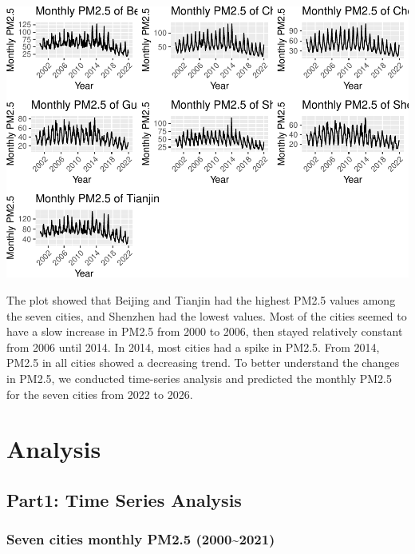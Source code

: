 \documentclass[
  12pt,
]{article}
\begin{document}
\includegraphics{LiFangRenZhang_ENV872_Project_files/figure-latex/TSA Visualization-1.pdf}

The plot showed that Beijing and Tianjin had the highest PM2.5 values
among the seven cities, and Shenzhen had the lowest values. Most of the
cities seemed to have a slow increase in PM2.5 from 2000 to 2006, then
stayed relatively constant from 2006 until 2014. In 2014, most cities
had a spike in PM2.5. From 2014, PM2.5 in all cities showed a decreasing
trend. To better understand the changes in PM2.5, we conducted
time-series analysis and predicted the monthly PM2.5 for the seven
cities from 2022 to 2026.

\newpage

\hypertarget{analysis}{%
\section{Analysis}\label{analysis}}

\hypertarget{part1-time-series-analysis}{%
\subsection{Part1: Time Series
Analysis}\label{part1-time-series-analysis}}

\hypertarget{seven-cities-monthly-pm2.5-20002021}{%
\subsubsection{Seven cities monthly PM2.5
(2000\textasciitilde2021)}\label{seven-cities-monthly-pm2.5-20002021}}
\end{document}
